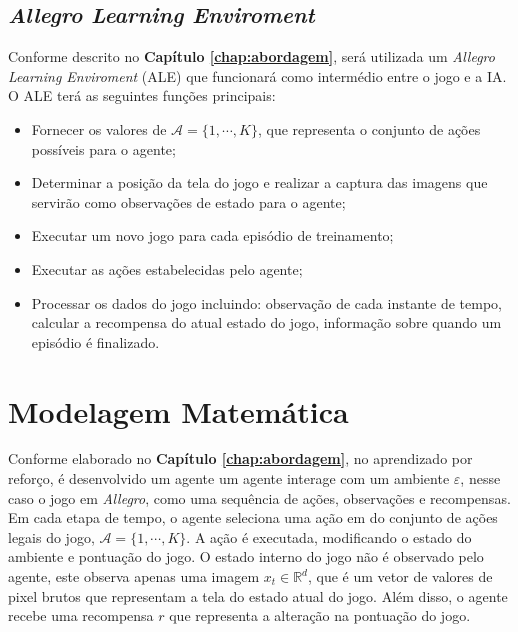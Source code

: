  
 \subsection{\textit{Allegro Learning Enviroment}} %
\label{sub:allegro_learning_enviroment}

Conforme descrito no \textbf{Capítulo \ref{chap:abordagem}}, será utilizada um \textit{Allegro Learning Enviroment} (ALE) que funcionará como intermédio entre o jogo e a IA. O ALE terá as seguintes funções principais:

\begin{itemize}
  \item Fornecer os valores de $\mathcal{A} = \{1,\cdots ,K\}$, que representa o conjunto de ações possíveis para o agente; 
  \item Determinar a posição da tela do jogo e realizar a captura das imagens que servirão como observações de estado para o agente;
  \item Executar um novo jogo para cada episódio de treinamento;
  \item Executar as ações estabelecidas pelo agente;
  \item Processar os dados do jogo incluindo: observação de cada instante de tempo, calcular a recompensa do atual estado do jogo, informação sobre quando um episódio é finalizado.
\end{itemize}



\section{Modelagem Matemática} %
\label{sec:modelagem_matematica}


Conforme elaborado no \textbf{Capítulo \ref{chap:abordagem}}, no aprendizado por reforço, é desenvolvido um agente  um agente interage com um ambiente $\varepsilon$, nesse caso o jogo em \textit{Allegro}, como uma sequência de ações, observações e recompensas.
Em cada etapa de tempo, o agente seleciona uma ação em do conjunto de ações legais do jogo, $\mathcal{A} = \{1,\cdots ,K\}$. A ação é executada, modificando o estado do ambiente e pontuação do jogo.
O estado interno do jogo não é observado pelo agente, este observa apenas uma imagem $x_t \in \mathbb{R}^d$, que é um vetor de valores de pixel brutos que representam a tela do estado atual do jogo. Além disso, o agente recebe uma recompensa $r$ que representa a alteração na pontuação do jogo.  

